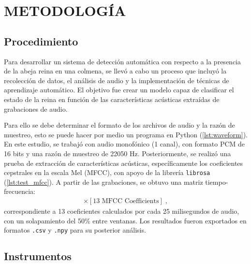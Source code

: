 \documentclass[12pt]{report}
\newenvironment{tightmulticols}{%
  \begin{multicols}{2}
  \setlength{\parskip}{0pt}
  \setlength{\parindent}{0em}
  \linespread{1}\selectfont
}{%
  \end{multicols}
}
\begin{document}
\pagebreak
\chapter{METODOLOGÍA}
\vspace{-3em}

\begin{tightmulticols}

\section{Procedimiento}

\par Para desarrollar un sistema de detección automática con respecto a la presencia de la abeja reina en una colmena, se llevó a cabo un proceso que incluyó la recolección de datos, el análisis de audio y la implementación de técnicas de aprendizaje automático. El objetivo fue crear un modelo capaz de clasificar el estado de la reina en función de las características acústicas extraídas de grabaciones de audio.

\par Para ello se debe determinar el formato de los archivos de audio y la razón de muestreo, esto se puede hacer por medio un programa en Python (\ref{lst:waveform}). En este estudio, se trabajó con audio monofónico (1 canal), con formato PCM de 16 bits y una razón de muestreo de 22050 Hz. Posteriormente, se realizó una prueba de extracción de características acústicas, específicamente los coeficientes cepstrales en la escala Mel (MFCC), con apoyo de la librería \texttt{librosa} (\ref{lst:test_mfcc}). A partir de las grabaciones, se obtuvo una matriz tiempo-frecuencia:
\begin{align*}
[\text{Time Frames}] \times [\text{13 MFCC Coefficients}] \; ,
\end{align*}
correspondiente a 13 coeficientes calculados por cada 25 milisegundos de audio, con un solapamiento del 50\% entre ventanas. Los resultados fueron exportados en formatos \texttt{.csv} y \texttt{.npy} para su posterior análisis.

\section{Instrumentos}


\end{tightmulticols}
\end{document}
